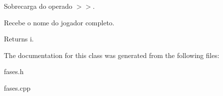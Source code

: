 Sobrecarga do operado $>$$>$. 

Recebe o nome do jogador completo. \begin{DoxyReturn}{Returns}
i. 
\end{DoxyReturn}


The documentation for this class was generated from the following files\+:\begin{DoxyCompactItemize}
\item 
fases.\+h\item 
fases.\+cpp\end{DoxyCompactItemize}

